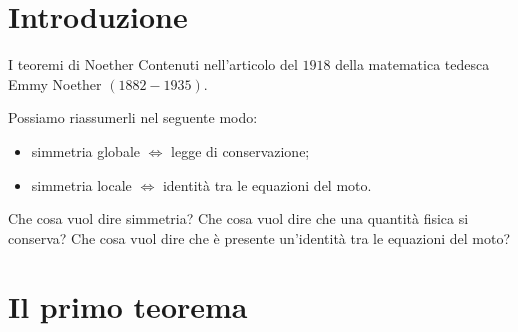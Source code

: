 

\begin{frame}
    \titlepage
\end{frame}


\section{Introduzione}

\begin{frame}{I teoremi di Noether}
    Contenuti nell'articolo del $1918$ della matematica tedesca Emmy Noether $(1882-1935)$. 

    \hfill 

    \pause Possiamo riassumerli nel seguente modo:
\begin{itemize}
    \item simmetria globale $\iff$ legge di conservazione;
    \item simmetria locale $\iff$ identità tra le equazioni del moto.
\end{itemize}

    \hfill 

    \pause Che cosa vuol dire simmetria? Che cosa vuol dire che una quantità fisica si conserva? Che cosa vuol dire che è presente un'identità tra le equazioni del moto? 
\end{frame}

\section{Il primo teorema}

